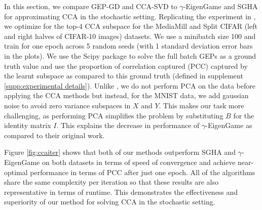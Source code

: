 In this section, we compare GEP-GD and CCA-SVD to $\gamma$-EigenGame \cite{gemp2022generalized} and SGHA \cite{chen2019constrained} for approximating CCA in the stochastic setting. Replicating the experiment in \cite{meng2021online, gemp2022generalized}, we optimize for the top-4 CCA subspace for the MediaMill and Split CIFAR (left and right halves of CIFAR-10 images) datasets. We use a minibatch size 100 and train for one epoch across 5 random seeds (with 1 standard deviation error bars in the plots). We use the Scipy \cite{virtanen2020scipy} package to solve the full batch GEPs as a ground truth value and use the proportion of correlation captured (PCC) captured by the learnt subspace as compared to this ground truth (defined in supplement \ref{supp:experimental details}). Unlike \cite{gemp2022generalized}, we do not perform PCA on the data before applying the CCA methods but instead, for the MNIST data, we add gaussian noise to avoid zero variance subspaces in $X$ and $Y$. This makes our task more challenging, as performing PCA simplifies the problem by substituting $B$ for the identity matrix $I$. This explains the decrease in performance of $\gamma$-EigenGame as compared to their original work.

Figure \ref{fig:ccaiter} shows that both of our methods outperform SGHA and $\gamma$-EigenGame on both datasets in terms of speed of convergence and achieve near-optimal performance in terms of PCC after just one epoch. All of the algorithms share the same complexity per iteration so that these results are also representative in terms of runtime. This demonstrates the effectiveness and superiority of our method for solving CCA in the stochastic setting.

